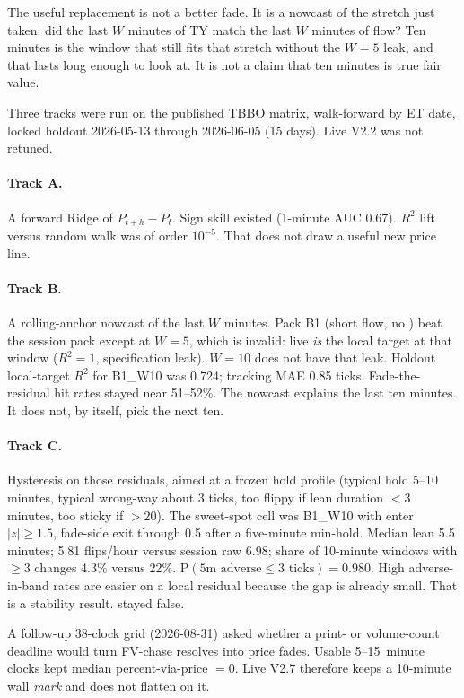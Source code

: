 \documentclass[11pt]{article}
\newcommand{\code}[1]{\texttt{\detokenize{#1}}}
\newcommand{\abs}[1]{\lvert #1 \rvert}
\begin{document}
The useful replacement is not a better fade.  It is a nowcast of
the stretch just taken: did the last \(W\) minutes of TY match the
last \(W\) minutes of flow?  Ten minutes is the window that still
fits that stretch without the \(W=5\) leak, and that lasts long
enough to look at.  It is not a claim that ten minutes is true
fair value.

Three tracks were run on the published TBBO matrix, walk-forward
by ET date, locked holdout 2026-05-13 through 2026-06-05
(15 days).  Live V2.2 was not retuned.

\paragraph{Track A.}
A forward Ridge of \(P_{t+h}-P_t\).  Sign skill existed
(1-minute AUC 0.67).  \(R^2\) lift versus random walk was of order
\(10^{-5}\).  That does not draw a useful new price line.

\paragraph{Track B.}
A rolling-anchor nowcast of the last \(W\) minutes.  Pack B1
(short flow, no \code{agg_30m}) beat the session pack except at
\(W=5\), which is invalid: live \code{mom_5m} \emph{is} the local
target at that window (\(R^2=1\), specification leak).  \(W=10\)
does not have that leak.  Holdout local-target \(R^2\) for
B1\_W10 was 0.724; tracking MAE 0.85 ticks.  Fade-the-residual
hit rates stayed near 51--52\%.  The nowcast explains the last
ten minutes.  It does not, by itself, pick the next ten.

\paragraph{Track C.}
Hysteresis on those residuals, aimed at a frozen hold profile
(typical hold 5--10 minutes, typical wrong-way about 3 ticks,
too flippy if lean duration \(<3\) minutes, too sticky if
\(>20\)).  The sweet-spot cell was B1\_W10 with enter
\(\abs{z}\ge 1.5\), fade-side exit through 0.5 after a five-minute
min-hold.  Median lean 5.5 minutes; 5.81 flips/hour versus session
raw 6.98; share of 10-minute windows with \(\ge 3\) changes 4.3\%
versus 22\%.  \(\mathrm{P}(\text{5m adverse}\le 3\text{ ticks})=0.980\).
High adverse-in-band rates are easier on a local residual because
the gap is already small.  That is a stability result.
\code{ship_gate} stayed false.

A follow-up 38-clock grid (2026-08-31) asked whether a print- or
volume-count deadline would turn FV-chase resolves into price
fades.  Usable 5--15~minute clocks kept median percent-via-price
\(=0\).  Live V2.7 therefore keeps a 10-minute wall \emph{mark}
and does not flatten on it.
\end{document}
